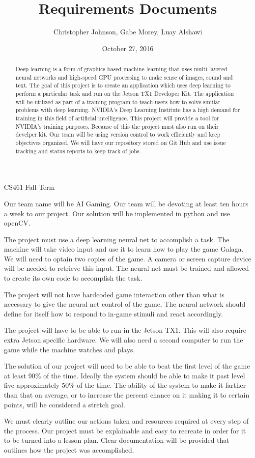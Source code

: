 \documentclass[letterpaper,10pt]{article}
\author{Christopher Johnson, Gabe Morey, Luay Alshawi}
\title{Requirements Documents}
\date{October 27, 2016}
\begin{document}
\begin{titlingpage}
\maketitle
CS461 Fall Term

\begin{abstract}
Deep learning is a form of graphics-based machine learning that uses multi-layered neural networks and high-speed 
GPU processing to make sense of images, sound and text. 
The goal of this project is to create an application which uses deep learning to perform a particular task and run on the Jetson TX1 Developer Kit.
The application will be utilized as part of a training program to teach users how to solve similar problems with deep learning. NVIDIA's Deep Learning Institute has a high demand for training in this field of artificial intelligence. 
This project will provide a tool for NVIDIA's training purposes. 
Because of this the project must also run on their develper kit.
Our team will be using version control to work efficiently and keep objectives organized. 
We will have our repository stored on Git Hub and use issue tracking and status reports to keep track of jobs.
\end{abstract}

\end{titlingpage}
Our team name will be AI Gaming.
Our team will be devoting at least ten hours a week to our project.
Our solution will be implemented in python and use openCV.

The project must use a deep learning neural net to accomplish a task.
The machine will take video input and use it to learn how to play the game Galaga. 
We will need to optain two copies of the game.
A camera or screen capture device will be needed to retrieve this input. 
The neural net must be trained and allowed to create its own code to accomplish the task.

The project will not have hardcoded game interaction other than what is necessary to give the neural net control of the game.
The neural network should define for itself how to respond to in-game stimuli and react accordingly.

The project will have to be able to run in the Jetson TX1. 
This will also require extra Jetson specific hardware.
We will also need a second computer to run the game while the machine watches and plays.

The solution of our project will need to be able to beat the first level of the game at least 90\% of the time. 
Ideally the system should be able to make it past level five approximately 50\% of the time.
The ability of the system to make it farther than that on average, or to increase the percent chance on it making it to certain points, will be considered a stretch goal.

We must clearly outline our actions taken and resources required at every step of the process.
Our project must be explainable and easy to recreate in order for it to be turned into a lesson plan.
Clear documentation will be provided that outlines how the project was accomplished.
\end{document}
